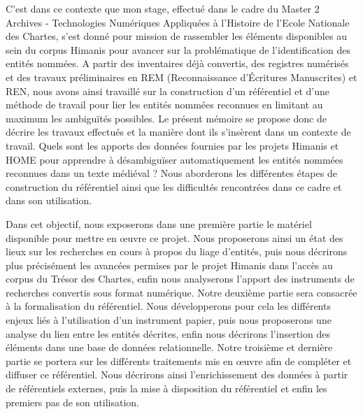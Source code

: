 \documentclass[a4paper,12pt,twoside]{book}
\makeatletter
\newcommand{\parttext}[1]{\def\@parttext{#1}}
\makeatother
\begin{document}
	C'est dans ce contexte que mon stage, effectué dans le cadre du Master 2 Archives - Technologies Numériques Appliquées à l'Histoire de l'Ecole Nationale des Chartes, s'est donné pour mission de rassembler les éléments disponibles au sein du corpus Himanis pour avancer sur la problématique de l'identification des entités nommées. A partir des inventaires déjà convertis, des registres numérisés et des travaux préliminaires en REM (Reconnaissance d'Écritures Manuscrites) et REN, nous avons ainsi travaillé sur la construction d'un référentiel et d'une méthode de travail pour lier les entités nommées reconnues en limitant au maximum les ambiguïtés possibles. Le présent mémoire se propose donc de décrire les travaux effectués et la manière dont ils s'insèrent dans un contexte de travail. Quels sont les apports des données fournies par les projets Himanis et HOME pour apprendre à désambiguïser automatiquement les entités nommées reconnues dans un texte médiéval ? Nous aborderons les différentes étapes de construction du référentiel ainsi que les difficultés rencontrées dans ce cadre et dans son utilisation.
	
	Dans cet objectif, nous exposerons dans une première partie le matériel disponible pour mettre en œuvre ce projet. Nous proposerons ainsi un état des lieux sur les recherches en cours à propos du liage d'entités, puis nous décrirons plus précisément les avancées permises par le projet Himanis dans l'accès au corpus du Trésor des Chartes, enfin nous analyserons l'apport des instruments de recherches convertis sous format numérique. Notre deuxième partie sera consacrée à la formalisation du référentiel. Nous développerons pour cela les différents enjeux liés à l'utilisation d'un instrument papier, puis nous proposerons une analyse du lien entre les entités décrites, enfin nous décrirons l'insertion des éléments dans une base de données relationnelle. Notre troisième et dernière partie se portera sur les différents traitements mis en œuvre afin de compléter et diffuser ce référentiel. Nous décrirons ainsi l'enrichissement des données à partir de référentiels externes, puis la mise à disposition du référentiel et enfin les premiers pas de son utilisation.
	
	\thispagestyle{empty}
	\cleardoublepage
	
	\mainmatter
	
	\parttext{Avant d'aborder plus précisément les actions menées au cours de ce stage, il convient d'exposer dans cette première partie les différents éléments contextuels dans lequel il s'inscrit. Nous consacrerons donc un premier chapitre à la description des enjeux scientifiques actuels autour de la problématique du liage d'entités afin de mieux appréhender les perspectives d'évolution. Un second chapitre permettra de résumer les différents résultats offerts par le projet Himanis et leur utilisation possible dans le cadre du stage. Enfin, le troisième chapitre sera consacré à l'utilisation des instruments de recherches papier pour construire un référentiel numérique.}
	
\end{document}
